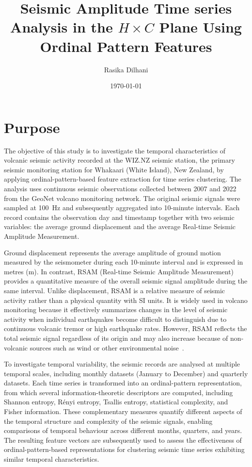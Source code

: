 \documentclass[12pt,a4paper]{article}
\title{Seismic Amplitude Time series Analysis in the $H \times C$ Plane Using Ordinal Pattern Features}
\author{Rasika Dilhani}
\date{\today}
\begin{document}
	
	\maketitle
	
\section{Purpose}
The objective of this study is to investigate the temporal characteristics of volcanic seismic activity recorded at the WIZ.NZ seismic station, the primary seismic monitoring station for Whakaari (White Island), New Zealand, by applying ordinal-pattern-based feature extraction for time series clustering. The analysis uses continuous seismic observations collected between 2007 and 2022 from the GeoNet volcano monitoring network. The original seismic signals were sampled at \SI{100}{\hertz} and subsequently aggregated into 10-minute intervals. Each record contains the observation day and timestamp together with two seismic variables: the average ground displacement and the average Real-time Seismic Amplitude Measurement.

Ground displacement represents the average amplitude of ground motion measured by the seismometer during each 10-minute interval and is expressed in metres (\si{\metre}). In contrast, RSAM (Real-time Seismic Amplitude Measurement) provides a quantitative measure of the overall seismic signal amplitude during the same interval. Unlike displacement, RSAM is a relative measure of seismic activity rather than a physical quantity with SI units. It is widely used in volcano monitoring because it effectively summarizes changes in the level of seismic activity when individual earthquakes become difficult to distinguish due to continuous volcanic tremor or high earthquake rates. However, RSAM reflects the total seismic signal regardless of its origin and may also increase because of non-volcanic sources such as wind or other environmental noise~\cite{GeoNetRSAM}.

To investigate temporal variability, the seismic records are analysed at multiple temporal scales, including monthly datasets (January to December) and quarterly datasets. Each time series is transformed into an ordinal-pattern representation, from which several information-theoretic descriptors are computed, including Shannon entropy,  R\'enyi entropy, Tsallis entropy, statistical complexity, and Fisher information. These complementary measures quantify different aspects of the temporal structure and complexity of the seismic signals, enabling comparisons of temporal behaviour across different months, quarters, and years. The resulting feature vectors are subsequently used to assess the effectiveness of ordinal-pattern-based representations for clustering seismic time series exhibiting similar temporal characteristics.
\end{document}
